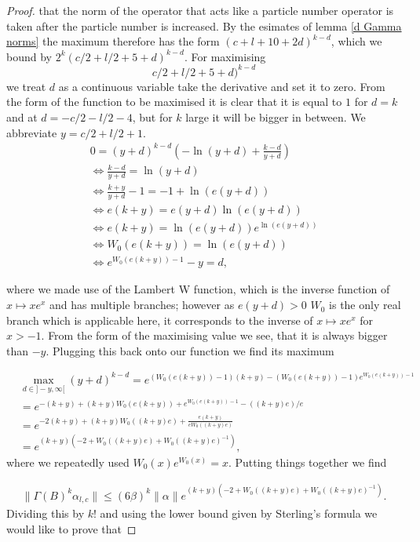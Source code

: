 \documentclass[b5paper,draft,openbib,12pt]{memoir}
\begin{document}
\begin{proof}
that the norm of the operator that acts like
a particle number operator is taken after the particle number is increased. 
By the esimates of lemma \ref{d Gamma norms} the maximum 
therefore has the form \((c+l+10+2d)^{k-d}\), which we bound 
by
\(2^k (c/2+l/2+5+d)^{k-d}\).
For maximising 
\begin{equation}
  c/2+l/2+5+d)^{k-d}
\end{equation}
we treat \(d\) as a continuous variable take the derivative and set it to zero. From the form of the function to be maximised
it is clear that it is equal to \(1\) for \(d=k\) and at \(d=-c/2-l/2-4\), but for \(k\) large it will be bigger in between. We abbreviate \(y=c/2+l/2+1\).
\begin{align}
0= (y+d)^{k-d} (-\ln(y+d) + \frac{k-d}{y+d})\\
\iff \frac{k-d}{y+d}= \ln (y+d)\\
\iff \frac{k+y}{y+d}  -1 = -1 + \ln (e (y+d))\\
\iff e(k+y)=e(y+d)\ln(e(y+d))\\
\iff e(k+y)=\ln(e(y+d)) e^{\ln(e(y+d))}\\
\iff W_0(e(k+y))=\ln(e(y+d))\\
\iff e^{W_0(e(k+y))-1}-y=d,
\end{align}

where we made use of the Lambert W function, which is the inverse function of \(x\mapsto x e^x\) and has multiple branches; however as \(e(y+d)>0\) 
\(W_0\) is the only real branch which is applicable here, it corresponds to the inverse of \(x\mapsto x e^x\) for \(x>-1\). 
From the form of the maximising value we see, that it is always bigger than \(-y\). Plugging this back onto our
function we find its maximum

\begin{align}\nonumber
&\max_{d\in ]-y,\infty[} (y+d)^{k-d}=e^{(W_0(e(k+y))-1) (k+y)- (W_0(e(k+y))-1)e^{W_0(e(k+y))-1}}\\\nonumber
&=e^{-(k+y) + (k+y)W_0(e(k+y)) + e^{W_0(e(k+y))-1} -((k+y)e)/e}\\\nonumber
&=e^{-2(k+y) + (k+y)W_0((k+y)e)+ \frac{e(k+y)}{eW_0((k+y)e)}}\\
&=e^{(k+y)(-2+W_0((k+y)e) + W_0((k+y)e)^{-1})},
\end{align}
where we repeatedly used \(W_0(x)e^{W_0(x)}=x\). Putting things together we find

\begin{align}
\|\Gamma(B)^k\alpha_{l,c}\|\le (6\beta )^k \|\alpha\| e^{(k+y)(-2+W_0((k+y)e) + W_0((k+y)e)^{-1})}.
\end{align}
Dividing this by \(k!\) and using the lower bound given by Sterling's formula we would like to prove that 


\end{proof}
\end{document}
